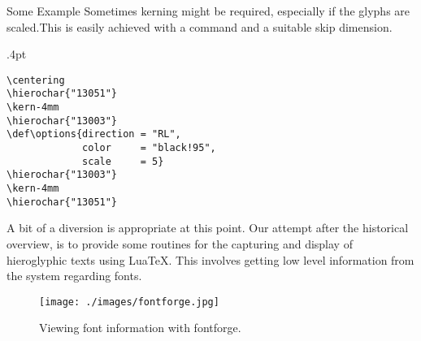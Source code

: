 {

\centering 

\def\options{direction = "LR",
             color     = "teal",
             scale     = 7}

\def\fontname{"hiero"}

\def\hierochar#1{\printhierochar[\options]{\fontname}{#1}}
}


\begin{scriptexample}[]{Some Example}
Sometimes kerning might be required, especially if the
glyphs are scaled.This is easily achieved with a \cmd{\kern}
command and a suitable skip dimension.

\medskip

\bgroup
\fboxsep=0pt\fboxsep.4pt
\def\options{direction = "RL",
             color     = "black!95",
             scale     = 5}
\centering

\color{teal}
\kern-4mm
\def\options{direction = "LR",
             color     = "black!95",
             scale     = 5}
\color{red}
\kern-4mm
\color{black!95}
\egroup
\begin{verbatim}
\centering
\hierochar{"13051"}
\kern-4mm
\hierochar{"13003"}
\def\options{direction = "RL",
             color     = "black!95",
             scale     = 5}
\hierochar{"13003"}
\kern-4mm
\hierochar{"13051"}
\end{verbatim}
\end{scriptexample}

A bit of a diversion is appropriate at this point. Our attempt after the historical overview, is to provide some routines for the capturing and display of hieroglyphic texts using LuaTeX. This involves getting low level information from the system regarding fonts. 

\begin{figure}[ht]
\begin{minipage}{0.45\textwidth}
\centering
\texttt{[image: ./images/fontforge.jpg]}
\end{minipage}
\begin{minipage}[t]{0.45\textwidth}
\caption{Viewing font information with fontforge.}
\end{minipage}
\end{figure}

